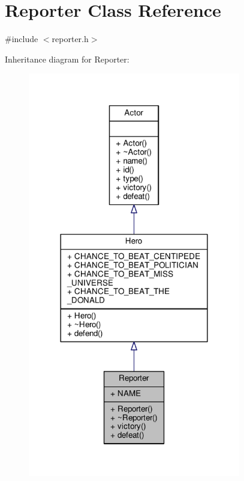 \hypertarget{classReporter}{}\section{Reporter Class Reference}
\label{classReporter}


{\ttfamily \#include $<$reporter.\+h$>$}



Inheritance diagram for Reporter\+:
\nopagebreak
\begin{figure}[H]
\begin{center}
\leavevmode
\includegraphics[width=263pt]{classReporter__inherit__graph}
\end{center}
\end{figure}


